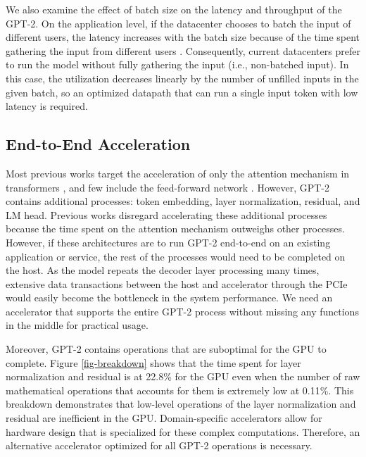 We also examine the effect of batch size on the latency and throughput of the GPT-2. On the application level, if the datacenter chooses to batch the input of different users, the latency increases with the batch size because of the time spent gathering the input from different users \cite{fowers2018configurable}. Consequently, current datacenters prefer to run the model without fully gathering the input (i.e., non-batched input). In this case, the utilization decreases linearly by the number of unfilled inputs in the given batch, so an optimized datapath that can run a single input token with low latency is required. 




\subsection{End-to-End Acceleration} \label{motivation_endtoend}

Most previous works target the acceleration of only the attention mechanism in transformers \cite{ham2020a3, ham2021elsa, zadeh2020gobo}, and few include the feed-forward network \cite{wang2021spatten}. However, GPT-2 contains additional processes: token embedding, layer normalization, residual, and LM head. Previous works disregard accelerating these additional processes because the time spent on the attention mechanism outweighs other processes. However, if these architectures are to run GPT-2 end-to-end on an existing application or service, the rest of the processes would need to be completed on the host. As the model repeats the decoder layer processing many times, extensive data transactions between the host and accelerator through the PCIe would easily become the bottleneck in the system performance. We need an accelerator that supports the entire GPT-2 process without missing any functions in the middle for practical usage.

Moreover, GPT-2 contains operations that are suboptimal for the GPU to complete. Figure \ref{fig-breakdown} shows that the time spent for layer normalization and residual is at 22.8\% for the GPU even when the number of raw mathematical operations that accounts for them is extremely low at 0.11\%. This breakdown demonstrates that low-level operations of the layer normalization and residual are inefficient in the GPU. Domain-specific accelerators allow for hardware design that is specialized for these complex computations. Therefore, an alternative accelerator optimized for all GPT-2 operations is necessary.

